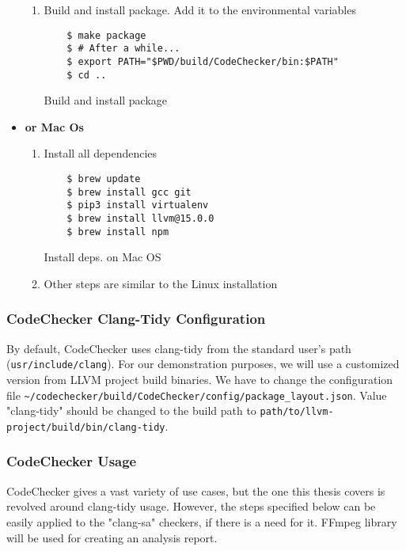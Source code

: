 \begin{itemize}
\begin{enumerate}
    \item Build and install package. Add it to the environmental variables
    \begin{listing}[H]
    \begin{verbatim}
    $ make package
    $ # After a while...
    $ export PATH="$PWD/build/CodeChecker/bin:$PATH" 
    $ cd ..
    \end{verbatim}
    \caption{Build and install package}
    \end{listing}
 \end{enumerate}

\item \textbf{or Mac Os}
    \begin{enumerate}
        \item Install all dependencies
        \begin{listing}[H]
        \begin{verbatim}
    $ brew update
    $ brew install gcc git
    $ pip3 install virtualenv
    $ brew install llvm@15.0.0
    $ brew install npm
        \end{verbatim}
        \caption{Install deps. on Mac OS}
        \end{listing}
        
        \item Other steps are similar to the Linux installation  
    \end{enumerate}
\end{itemize}

\subsubsection{CodeChecker Clang-Tidy Configuration }
By default, CodeChecker uses clang-tidy from the standard user's path (\lstinline{usr/include/clang}). For our demonstration purposes, we will use a customized version from LLVM project build binaries. We have to change the configuration file \lstinline{~/codechecker/build/CodeChecker/config/package_layout.json}. Value "clang-tidy" should be changed to the build path to \lstinline{path/to/llvm-project/build/bin/clang-tidy}. 

\subsubsection{CodeChecker Usage} 

CodeChecker gives a vast variety of use cases, but the one this thesis covers is revolved around clang-tidy usage. However, the steps specified below can be easily applied to the "clang-sa" checkers, if there is a need for it. FFmpeg library will be used for creating an analysis report.

